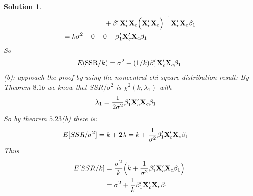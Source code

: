 \documentclass[11pt]{article}
\newtheorem{sol}{Solution}
\begin{document}
\begin{sol}
\begin{align*}
		&\ \hskip 2cm + \beta_1'{\bf X}_c'{\bf X}_c\Big({\bf X}_c'{\bf X}_c\Big)^{-1}{\bf X}_c'{\bf X}_c\beta_1\\
		&= k\sigma^2 + 0 + 0 + \beta'_1{\bf X}_c'{\bf X}_c\beta_1
	\end{align*} 
	So
	\begin{align*}
		E(\text{SSR}/k) = \sigma^2 + (1/k){\bf \beta}_1'{\bf X}'_c{\bf X}_c{\bf \beta}_1
	\end{align*}
	(b):  approach the proof by using the noncentral chi square distribution result:\vskip 2mm
	By Theorem $8.1b$ we know that $SSR/\sigma^2$ is $\chi^2(k, \lambda_1)$ with
	\begin{align*}
		\lambda_1 &= \frac{1}{2\sigma^2}{\bf \beta}_1'{\bf X}'_c{\bf X}_c{\bf \beta}_1
	\end{align*}	
	So by theorem $5.23$(b) there is:
	\begin{align*}
		E[SSR/\sigma^2] &= k + 2\lambda = k + \frac{1}{\sigma^2}{\bf \beta}_1'{\bf X}'_c{\bf X}_c{\bf \beta}_1
	\end{align*}	
	Thus
	\begin{align*}
		E[SSR/k] &= \frac{\sigma^2}{k}\Big(k + \frac{1}{\sigma^2}{\bf \beta}_1'{\bf X}'_c{\bf X}_c{\bf \beta}_1\Big)\\
		&= \sigma^2 + \frac{1}{k}{\bf \beta}_1'{\bf X}'_c{\bf X}_c{\bf \beta}_1
	\end{align*}

\end{sol}
\end{document}
